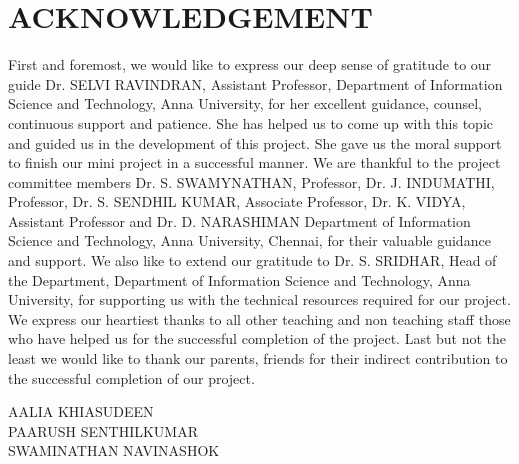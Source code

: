 \chapter*{\uppercase{ACKNOWLEDGEMENT}}
 First and foremost, we would like to express our deep sense
of gratitude to our guide Dr. SELVI RAVINDRAN, Assistant Professor,
Department of Information Science and Technology, Anna University, for her
excellent guidance, counsel, continuous support and patience. She has helped
us to come up with this topic and guided us in the development of this project.
She gave us the moral support to finish our mini project in a successful manner.
We are thankful to the project committee members Dr. S.
SWAMYNATHAN, Professor, Dr. J. INDUMATHI, Professor, Dr. S. SENDHIL KUMAR, Associate Professor, Dr. K. VIDYA, Assistant Professor and Dr. D. NARASHIMAN Department
of Information Science and 
Technology, Anna University, Chennai, for their
valuable guidance and support.
We also like to extend our gratitude to Dr. S. SRIDHAR, Head
of the Department, Department of Information Science and Technology, Anna
University, for supporting us with the technical resources required for our
project. We express our heartiest thanks to all other teaching and non teaching
staff those who have helped us for the successful completion of the project. Last
but not the least we would like to thank our parents, friends for their indirect
contribution to the successful completion of our project.
\begin{flushright}AALIA KHIASUDEEN\\PAARUSH SENTHILKUMAR\\SWAMINATHAN NAVINASHOK\end{flushright}


